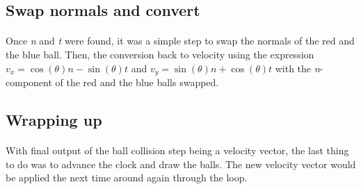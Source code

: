 \documentclass[12pt]{report}
\begin{document}
\subsection{Swap normals and convert}
\paragraph{}	Once \textit{n} and \textit{t} were found, it was a simple step to swap the normals of the red and the blue ball. Then, the conversion back to velocity using the expression 
\(v_x = \cos(\theta)n - \sin(\theta)t\) and \(v_y = \sin(\theta)n + \cos(\theta)t\) with the \textit{n}-component of the red and the blue balls swapped.

\subsection{Wrapping up}
\paragraph{}	With final output of the ball collision step being a velocity vector, the last thing to do was to advance the clock and draw the balls. The new velocity vector would be applied the next time around again through the loop.
\end{document}

